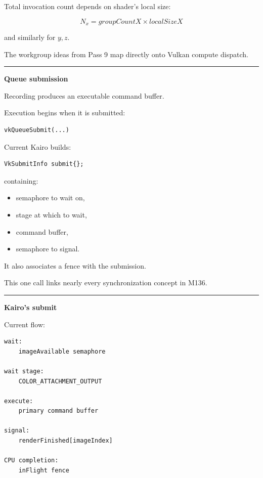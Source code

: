 Total invocation count depends on shader's local size:

\[
N_x=
groupCountX\times localSizeX
\]

and similarly for \(y,z\).

The workgroup ideas from Pass 9 map directly onto Vulkan compute dispatch.

\begin{center}\rule{0.5\linewidth}{0.5pt}\end{center}

\textbf{Queue submission}

Recording produces an executable command buffer.

Execution begins when it is submitted:

\begin{verbatim}
vkQueueSubmit(...)
\end{verbatim}

Current Kairo builds:

\begin{verbatim}
VkSubmitInfo submit{};
\end{verbatim}

containing:

\begin{itemize}
\tightlist
\item
  semaphore to wait on,
\item
  stage at which to wait,
\item
  command buffer,
\item
  semaphore to signal.
\end{itemize}

It also associates a fence with the submission.

This one call links nearly every synchronization concept in M136.

\begin{center}\rule{0.5\linewidth}{0.5pt}\end{center}

\textbf{Kairo's submit}

Current flow:

\begin{verbatim}
wait:
    imageAvailable semaphore

wait stage:
    COLOR_ATTACHMENT_OUTPUT

execute:
    primary command buffer

signal:
    renderFinished[imageIndex]

CPU completion:
    inFlight fence
\end{verbatim}

